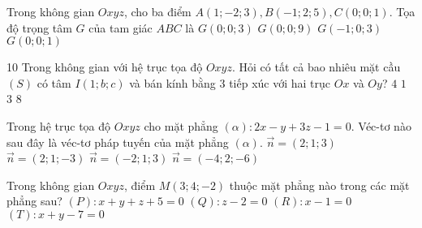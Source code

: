 \begin{ex}%
Trong không gian $O x y z$, cho ba điểm $A(1 ;-2 ; 3), B(-1 ; 2 ; 5), C(0 ; 0 ; 1)$. Tọa độ trọng tâm $G$ của tam giác $A B C$ là
\choice
{\True $G(0 ; 0 ; 3)$}
{$G(0 ; 0 ; 9)$}
{$G(-1 ; 0 ; 3)$}
{$G(0 ; 0 ; 1)$}
\end{ex}

\begin{ex}10%
Trong không gian với hệ trục tọa độ $Oxyz$. Hỏi có tất cả bao nhiêu mặt cầu $(S)$ có tâm $I(1;b;c)$ và bán kính bằng $3$ tiếp xúc với hai trục $Ox$ và $Oy$?
\choice
{\True $4$}
{$1$}
{$3$}
{$8$}
\end{ex}

\begin{ex}%
Trong hệ trục tọa độ $Oxyz$ cho mặt phẳng $(\alpha)\colon 2x-y+3z-1=0$. Véc-tơ nào sau đây là véc-tơ pháp tuyến của mặt phẳng $(\alpha)$.
\choice
{$\overrightarrow{n}=(2;1;3)$}
{$\overrightarrow{n}=(2;1;-3)$}
{$\overrightarrow{n}=(-2;1;3)$}
{\True $\overrightarrow{n}=(-4;2;-6)$}
\end{ex}

\begin{ex}%
Trong không gian $O x y z$, điểm $M(3 ; 4 ;-2)$ thuộc mặt phẳng nào trong các mặt phẳng sau?
\choice
{$(P): x+y+z+5=0$}
{$(Q): z-2=0$}
{$(R): x-1=0$}
{\True $(T): x+y-7=0$}
\end{ex}

